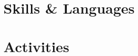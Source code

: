\documentclass[10pt]{article}
\begin{document}
\begin{minipage}{\linewidth}
  \vspace{-1em}
  \section{Skills \& Languages}
  \begin{multicols}{4}
    \raggedcolumns
    \begin{itemize}
      \renewcommand{\labelitemi}{}
      \renewcommand{\skill}{\textnormal}
      \setlength{\itemsep}{1pt}
      \setlength{\parskip}{0pt}
      \setlength{\parsep}{0pt}
      \skillsListLong
    \end{itemize}
  \end{multicols}
  \skillsLegend
\end{minipage}
\vspace{-1em}

\section{Activities}
\activities

\footer

\end{document}
